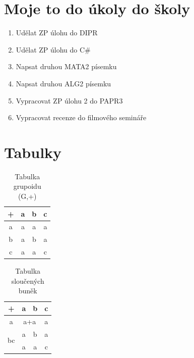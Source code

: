 \documentclass[a4paper, 12pt]{article}
\begin{document}
\section{Moje to do úkoly do školy}
\label{todo} %

\begin{enumerate} %
	\item Udělat ZP úlohu do DIPR 
	\item Udělat ZP úlohu do C\#
	\item Napsat druhou MATA2 písemku
	\item Napsat druhou ALG2 písemku
	\item Vypracovat ZP úlohu 2 do PAPR3
	\item Vypracovat recenze do filmového semináře
\end{enumerate}
\newpage

\section{Tabulky}
\label{tabs} %

\begin{table}[H] %
	\begin{center}
	\caption{Tabulka grupoidu (G,+)}
	\label{tab:table1}
		\begin{tabular}{c|c c c}
		\textbf{+} & a & b & c\\
     	\hline
     	a & a & a & a \\
      	b & a & b & a \\
      	c & a & a & c \\	
		\end{tabular}
	\end{center}
\end{table}

\begin{table}[H]
	\begin{center}
	\caption{Tabulka sloučených buněk}
	\label{tab:table2}
		\begin{tabular}{|c|c|c|c|}
		\hline %
		
		\textbf{+} & a & b & c\\
		\hline
		
     	a & \multicolumn{2}{c|}{a+a} & a \\
     	\hline
     	
      	\multirow{2}{*}{bc} & a & b &a\\
    	  & a & a & c\\ %
      	\hline
		\end{tabular}
	\end{center}
\end{table}
\end{document}
